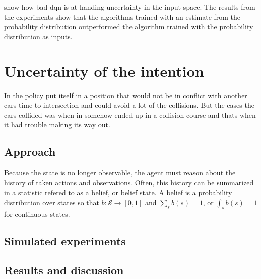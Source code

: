 	


\paperBelief show how bad \gls{dqn} is at handing uncertainty in the input space. The results from the experiments show that the algorithms trained with an estimate from the probability distribution outperformed the algorithm trained with the probability distribution as inputs. 

\section{Uncertainty of the intention}
In \paperLSTM the policy put itself in a position that would not be in conflict with another cars time to intersection and could avoid a lot of the collisions. But the cases the cars collided was when in somehow ended up in a collision course and thats when it had trouble making its way out. 

\subsection{Approach}


Because the state is no longer observable, the agent must reason about the history of taken actions and observations. Often, this history can be summarized in a statistic refered to as a belief, or belief state. A belief is a probability distribution over states so that $b: \mathcal{S} \rightarrow [0,1]$ and $\sum_{s} b(s)=1$, or $\int_{s} b(s)=1$ for continuous states. 

\subsection{Simulated experiments}

\subsection{Results and discussion}